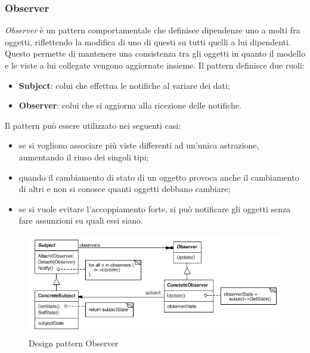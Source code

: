 \subsubsection{Observer}
\textit{Observer} è un pattern comportamentale che definisce dipendenze uno a molti fra oggetti, riflettendo la modifica di uno di questi su tutti quelli a lui dipendenti. Questo permette di mantenere una consistenza tra gli oggetti in quanto il modello e le viste a lui collegate vengono aggiornate insieme. 
Il pattern definisce due ruoli:
\begin{itemize}
	\item \textbf{Subject}: colui che effettua le notifiche al variare dei dati;
	\item \textbf{Observer}: colui che si aggiorna alla ricezione delle notifiche.
\end{itemize}
Il pattern può essere utilizzato nei seguenti casi:
\begin{itemize}
	\item se si vogliono associare più viste differenti ad un'unica astrazione, aumentando il riuso dei singoli tipi;
	\item quando il cambiamento di stato di un oggetto provoca anche il cambiamento di altri e non si conosce quanti oggetti debbano cambiare;
	\item se si vuole evitare l'accoppiamento forte, si può notificare gli oggetti senza fare assunzioni su quali essi siano.
\end{itemize}

\begin{figure}[H]
	\centering
	\includegraphics[width=14cm]{diagrammi_img/observer.png}
	\caption{Design pattern Observer}
\end{figure}